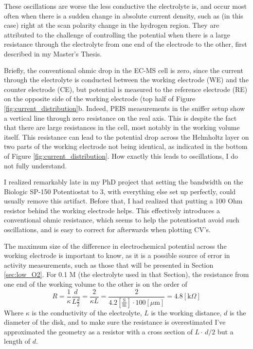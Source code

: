 These oscillations are worse the less conductive the electrolyte is, and occur most often when there is a sudden change in absolute current density, such as (in this case) right at the scan polarity change in the hydrogen region. They are attributed to the challenge of controlling the potential when there is a large resistance through the electrolyte from one end of the electrode to the other, first described in my Master's Thesis\cite{Scott2016_MSc}. 

Briefly, the conventional ohmic drop in the EC-MS cell is zero, since the current through the electrolyte is conducted between the working electrode (WE) and the counter electrode (CE), but potential is measured to the reference electrode (RE) on the opposite side of the working electrode (top half of Figure \ref{fig:current_distribution}b. Indeed, PEIS measurements in the sniffer setup show a vertical line through zero resistance on the real axis. This is despite the fact that there are large resistances in the cell, most notably in the working volume itself. This resistance can lead to the potential drop across the Helmholtz layer on two parts of the working electrode not being identical, as indicated in the bottom of Figure \ref{fig:current_distribution}. How exactly this leads to oscillations, I do not fully understand.

I realized remarkably late in my PhD project that setting the bandwidth on the Biologic SP-150 Potentiostat to 3, with everything else set up perfectly, could usually remove this artifact. Before that, I had realized that putting a 100 Ohm resistor behind the working electrode helps. This effectively introduces a conventional ohmic resistance, which seems to help the potentiostat avoid such oscillations, and is easy to correct for afterwards when plotting CV's.

The maximum size of the difference in electrochemical potential across the working electrode is important to know, as it is a possible source of error in activity measurements, such as those that will be presented in Section \ref{sec:low_O2}. For 0.1 M  (the electrolyte used in that Section), the resistance from one end of the working volume to the other is on the order of
\begin{equation}
R = \frac{1}{\kappa}\frac{d}{L\frac{d}{2}} = \frac{2}{\kappa L} = \frac{2}{4.2 \left[\frac{\text{S}}{\text{m}}\right]\cdot 100[\mu\text{m}]} = 4.8 [\text{k}\Omega]
\end{equation}
Where $\kappa$ is the conductivity of the electrolyte, $L$ is the working distance, $d$ is the diameter of the disk, and to make sure the resistance is overestimated I've approximated the geometry as a resistor with a cross section of $L\cdot\, d/2$ but a length of $d$. 

